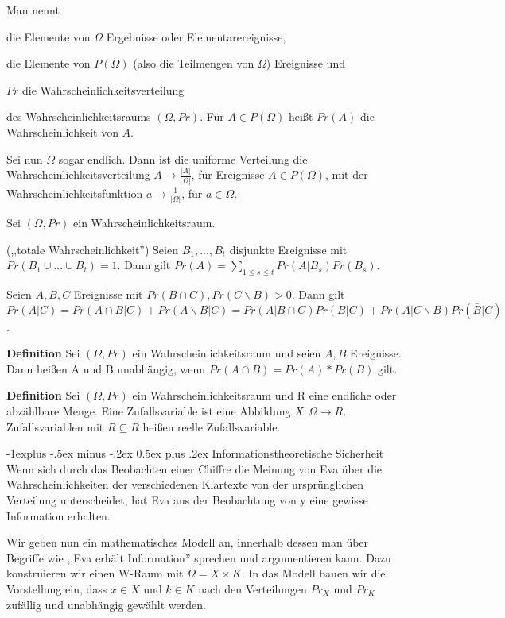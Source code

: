 \documentclass[a4paper]{article}
\makeatletter
\renewcommand{\subsection}{\@startsection{subsection}{2}{0mm}%
 {-1explus -.5ex minus -.2ex}%
 {0.5ex plus .2ex}%
 {\normalfont\normalsize\bfseries}}
\makeatother
\begin{document}
\begin{multicols}{3}
    Man nennt
    \begin{itemize*}
        \item die Elemente von $\Omega$ Ergebnisse oder Elementarereignisse,
        \item die Elemente von $P(\Omega)$ (also die Teilmengen von $\Omega$) Ereignisse und
        \item $Pr$ die Wahrscheinlichkeitsverteilung
    \end{itemize*}
    des Wahrscheinlichkeitsraums $(\Omega,Pr)$. Für $A\in P(\Omega)$ heißt $Pr(A)$ die Wahrscheinlichkeit von $A$.

    Sei nun $\Omega$ sogar endlich. Dann ist die uniforme Verteilung die Wahrscheinlichkeitsverteilung $A\rightarrow\frac{|A|}{|\Omega|}$, für Ereignisse $A\in P(\Omega)$, mit der Wahrscheinlichkeitsfunktion $a\rightarrow \frac{1}{|\Omega|}$, für $a\in\Omega$.

    Sei $(\Omega,Pr)$ ein Wahrscheinlichkeitsraum.
    \begin{enumerate*}
        \item (,,totale Wahrscheinlichkeit'') Seien $B_1,...,B_t$ disjunkte Ereignisse mit $Pr(B_1\cup...\cup B_t)=1$. Dann gilt $Pr(A)=\sum_{1\leq s\leq t} Pr(A|B_s)Pr(B_s)$.
        \item Seien $A,B,C$ Ereignisse mit $Pr(B\cap C),Pr(C\backslash B)>0$. Dann gilt $Pr(A|C)=Pr(A\cap B | C) + Pr(A\backslash B|C)= Pr(A|B\cap C)Pr(B|C) + Pr(A|C\backslash B)Pr(\bar{B}|C)$.
    \end{enumerate*}

    \textbf{Definition} Sei $(\Omega,Pr)$ ein Wahrscheinlichkeitsraum und seien $A,B$ Ereignisse. Dann heißen A und B unabhängig, wenn $Pr(A\cap B)=Pr(A)*Pr(B)$ gilt.

    \textbf{Definition} Sei $(\Omega,Pr)$ ein Wahrscheinlichkeitsraum und R eine endliche oder abzählbare Menge. Eine Zufallsvariable ist eine Abbildung $X:\Omega\rightarrow R$. Zufallsvariablen mit $R\subseteq R$ heißen reelle Zufallsvariable.

    \subsection{Informationstheoretische Sicherheit}
   Wenn sich durch das Beobachten einer Chiffre die Meinung von Eva über die Wahrscheinlichkeiten der verschiedenen Klartexte von der ursprünglichen Verteilung unterscheidet, hat Eva aus der Beobachtung von y eine gewisse Information erhalten.

    Wir geben nun ein mathematisches Modell an, innerhalb dessen man über Begriffe wie ,,Eva erhält Information'' sprechen und argumentieren kann. Dazu konstruieren wir einen W-Raum mit $\Omega=X\times K$. In das Modell bauen wir die Vorstellung ein, dass $x\in X$ und $k\in K$ nach den Verteilungen $Pr_X$ und $Pr_K$ zufällig und unabhängig gewählt werden.


\end{multicols}
\end{document}
